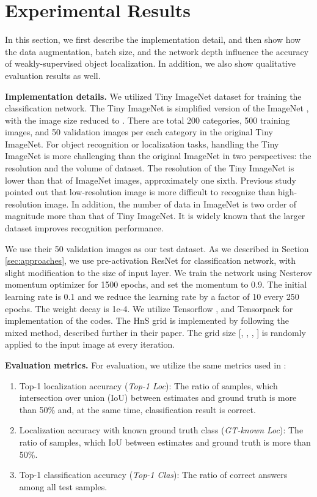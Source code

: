 \documentclass{bmvc2k}
\begin{document}
\section{Experimental Results}
\label{sec:experiments}

In this section, we first describe the implementation detail, and then show how the data augmentation, batch size, and the network depth influence the accuracy of weakly-supervised object localization. In addition, we also show qualitative evaluation results as well. 

\textbf{Implementation details.} We utilized Tiny ImageNet dataset for training the classification network. The Tiny ImageNet is simplified version of the ImageNet \cite{russakovsky2015imagenet}, with the image size reduced to . There are total 200 categories, 500 training images, and 50 validation images per each category in the original Tiny ImageNet. For object recognition or localization tasks, handling the Tiny ImageNet is more challenging than the original ImageNet in two perspectives: the resolution and the volume of dataset. The resolution of the Tiny ImageNet is lower than that of ImageNet images, approximately one sixth. Previous study \cite{odena2016conditional} pointed out that low-resolution image is more difficult to recognize than high-resolution image. In addition, the number of data in ImageNet is two order of magnitude more than that of Tiny ImageNet. It is widely known that the larger dataset improves recognition performance. 

We use their 50 validation images as our test dataset. As we described in Section \ref{sec:approaches}, we use pre-activation ResNet for classification network, with slight modification to the size of input layer. We train the network using Nesterov momentum optimizer \cite{bengio2013advances} for 1500 epochs, and set the momentum to 0.9. The initial learning rate is 0.1 and we reduce the learning rate by a factor of 10 every 250 epochs. The weight decay is 1e-4. We utilize Tensorflow \cite{abadi2016tensorflow}, and Tensorpack \cite{wu2016tensorpack} for implementation of the codes. The HnS grid is implemented by following the mixed method, described further in their paper. The grid size [, , , ] is randomly applied to the input image at every iteration.



\textbf{Evaluation metrics.} For evaluation, we utilize the same metrics used in \cite{singh2017hide}:
\begin{enumerate}
  \item Top-1 localization accuracy (\textit{Top-1 Loc}): The ratio of samples, which intersection over union (IoU) between estimates and ground truth is more than 50\% and, at the same time, classification result is correct.
  \item Localization accuracy with known ground truth class (\textit{GT-known Loc}): The ratio of samples, which IoU between estimates and ground truth is more than 50\%.
  \item Top-1 classification accuracy (\textit{Top-1 Clas}): The ratio of correct answers among all test samples. 
\end{enumerate}
\end{document}
